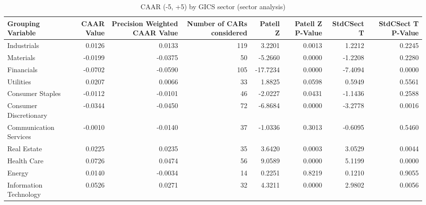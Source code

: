 \begin{table}
\caption{CAAR (-5, +5) by GICS sector (sector analysis)}
\label{tab:sector_caar}
\begin{tabular}{lrrrrrrr}
\toprule
Grouping Variable & CAAR Value & Precision Weighted CAAR Value & Number of CARs considered & Patell Z & Patell Z P-Value & StdCSect T & StdCSect T P-Value \\
\midrule
Industrials & 0.0126 & 0.0133 & 119 & 3.2201 & 0.0013 & 1.2212 & 0.2245 \\
Materials & -0.0199 & -0.0375 & 50 & -5.2660 & 0.0000 & -1.2208 & 0.2280 \\
Financials & -0.0702 & -0.0590 & 105 & -17.7234 & 0.0000 & -7.4094 & 0.0000 \\
Utilities & 0.0207 & 0.0066 & 33 & 1.8825 & 0.0598 & 0.5949 & 0.5561 \\
Consumer Staples & -0.0112 & -0.0101 & 46 & -2.0227 & 0.0431 & -1.1436 & 0.2588 \\
Consumer Discretionary & -0.0344 & -0.0450 & 72 & -6.8684 & 0.0000 & -3.2778 & 0.0016 \\
Communication Services & -0.0010 & -0.0140 & 37 & -1.0336 & 0.3013 & -0.6095 & 0.5460 \\
Real Estate & 0.0225 & 0.0235 & 35 & 3.6420 & 0.0003 & 3.0529 & 0.0044 \\
Health Care & 0.0726 & 0.0474 & 56 & 9.0589 & 0.0000 & 5.1199 & 0.0000 \\
Energy & 0.0140 & -0.0034 & 14 & 0.2251 & 0.8219 & 0.1210 & 0.9055 \\
Information Technology & 0.0526 & 0.0271 & 32 & 4.3211 & 0.0000 & 2.9802 & 0.0056 \\
\bottomrule
\end{tabular}
\end{table}
